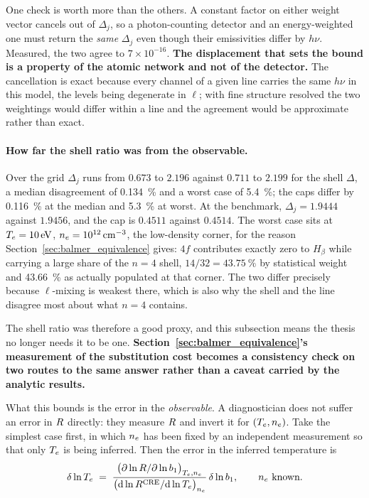 One check is worth more than the others. A constant factor on either weight
vector cancels out of $\Delta_j$, so a photon-counting detector and an
energy-weighted one must return the \emph{same} $\Delta_j$ even though their
emissivities differ by $h\nu$. Measured, the two agree to
$7\times10^{-16}$. \textbf{The displacement that sets the bound is a property of
the atomic network and not of the detector.} The cancellation is exact because
every channel of a given line carries the same $h\nu$ in this model, the levels
being degenerate in $\ell$; with fine structure resolved the two weightings
would differ within a line and the agreement would be approximate rather than
exact.

\paragraph{How far the shell ratio was from the observable.} Over the grid
$\Delta_j$ runs from $0.673$ to $2.196$ against $0.711$ to $2.199$ for the shell
$\Delta$, a median disagreement of \SI{0.134}{\percent} and a worst case of
\SI{5.4}{\percent}; the caps differ by \SI{0.116}{\percent} at the median and
\SI{5.3}{\percent} at worst. At the benchmark, $\Delta_j = 1.9444$ against
$1.9456$, and the cap is $0.4511$ against $0.4514$. The worst case sits at
$T_e = \SI{10}{\electronvolt}$, $n_e = \SI{e12}{\per\cubic\centi\metre}$, the
low-density corner, for the reason Section~\ref{sec:balmer_equivalence} gives:
$4f$ contributes exactly zero to $H_\beta$ while carrying a large share of the
$n=4$ shell, $14/32 = \SI{43.75}{\percent}$ by statistical weight and
\SI{43.66}{\percent} as actually populated at that corner. The two differ
precisely because $\ell$-mixing is weakest there, which is also why the shell
and the line disagree most about what $n=4$ contains.

The shell ratio was therefore a good proxy, and this subsection means the thesis
no longer needs it to be one. \textbf{Section~\ref{sec:balmer_equivalence}'s
measurement of the substitution cost becomes a consistency check on two routes
to the same answer rather than a caveat carried by the analytic results.}

What this bounds is the error in the \emph{observable}. A diagnostician does not suffer an error in
$R$ directly: they measure $R$ and invert it for $(T_e,n_e)$. Take the
simplest case first, in which $n_e$ has been fixed by an independent
measurement so that only $T_e$ is being inferred. Then the error in the inferred
temperature is
\begin{equation}
  \delta\ln T_e \;=\;
  \frac{\big(\partial\ln R/\partial\ln b_1\big)_{T_e,n_e}}
       {\big(\mathrm{d}\ln R^{\mathrm{CRE}}/\mathrm{d}\ln T_e\big)_{n_e}}\,\delta\ln b_1 ,
  \qquad n_e \text{ known} .
  \label{eq:inversion_jacobian}
\end{equation}

